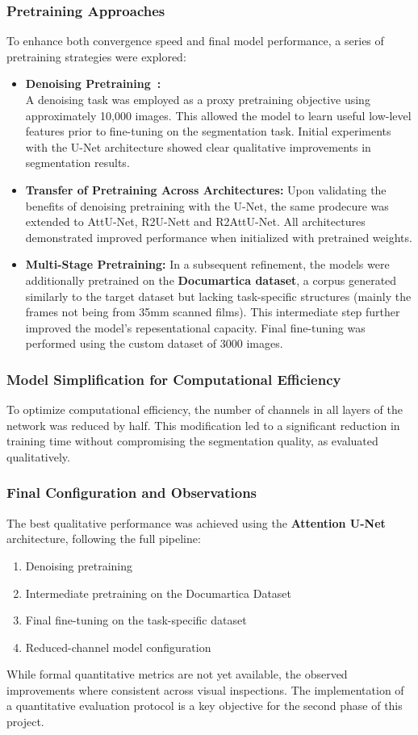 \documentclass[openany, 12pt]{article}
\begin{document}
	\subsubsection*{Pretraining Approaches}
	To enhance both convergence speed and final model performance, a series of pretraining strategies were explored:
	\begin{itemize}
		\item \textbf{Denoising Pretraining~\cite{9857234}:} \\
		A denoising task was employed as a proxy pretraining objective using approximately 10,000 images. This allowed the model to learn useful low-level features prior to fine-tuning on the segmentation task. Initial experiments with the U-Net architecture showed clear qualitative improvements in segmentation results.
		\item \textbf{Transfer of Pretraining Across Architectures:}
		Upon validating the benefits of denoising pretraining with the U-Net, the same prodecure was extended to AttU-Net, R2U-Nett and R2AttU-Net. All architectures demonstrated improved performance when initialized with pretrained weights.
		\item \textbf{Multi-Stage Pretraining:}
		In a subsequent refinement, the models were additionally pretrained on the \textbf{Documartica dataset}, a corpus generated similarly to the target dataset but lacking task-specific structures (mainly the frames not being from 35mm scanned films). This intermediate step further improved the model's repesentational capacity. Final fine-tuning was performed using the custom dataset of 3000 images. 
	\end{itemize}
	\subsubsection*{Model Simplification for Computational Efficiency}
	To optimize computational efficiency, the number of channels in all layers of the network was reduced by half. This modification led to a significant reduction in training time without compromising the segmentation quality, as evaluated qualitatively.
	
	\subsubsection*{Final Configuration and Observations}
	The best qualitative performance was achieved using the \textbf{Attention U-Net} architecture, following the full pipeline:
	\begin{enumerate}
		\item Denoising pretraining
		\item Intermediate pretraining on the Documartica Dataset
		\item Final fine-tuning on the task-specific dataset
		\item Reduced-channel model configuration
	\end{enumerate}
	While formal quantitative metrics are not yet available, the observed improvements where consistent across visual inspections. The implementation of a quantitative evaluation protocol is a key objective for the second phase of this project.
\end{document}
